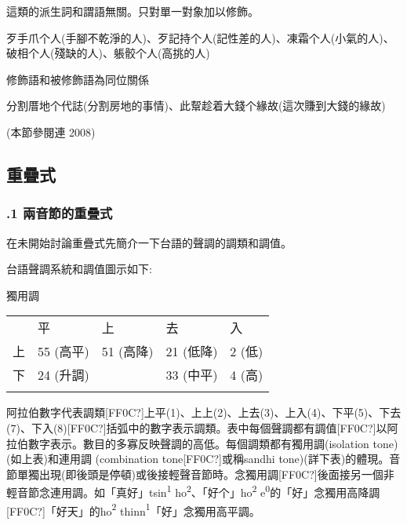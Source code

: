 \textrm{這類的派生詞和謂語無關。只對單一對象加以修飾。}

\textrm{歹手爪个人(手腳不乾淨的人)}、\textrm{歹記持个人(記性差的人)}、\textrm{凍霜个人(小氣的人)}、\textrm{破相个人(殘缺的人)}、\textrm{躼骹个人(高挑的人)}

\begin{listWWviiiNumxivleveli}
\item \begin{styleqwerty}\rmfamily
修飾語和被修飾語為同位關係
\end{styleqwerty}
\end{listWWviiiNumxivleveli}

\textrm{分割厝地个代誌(分割房地的事情)}、\textrm{此幚趁着大錢个緣故(這次賺到大錢的緣故)}

\rmfamily
(本節參閱連 2008)

\subsection{ 重疊式}
\subsubsection{.1 兩音節的重疊式}

\textrm{在未開始討論重疊式先簡介一下台語的聲調的調類和調值。}

\rmfamily
台語聲調系統和調值圖示如下:

獨用調

\tablefirsthead{}

\tabletail{}
\tablelasttail{}
\begin{tabularx}{\textwidth}{XXXXX} & 平 & 上 & 去 & 入\\
\lsptoprule
上 & 55 (高平) & 51 (高降) & 21 (低降) & 2 (低)\\
下 & 24 (升調) &  & 33 (中平) & 4 (高)\\
\lspbottomrule
\end{tabularx}
\textrm{阿拉伯數字代表調類[FF0C?]上平(1)}、\textrm{上上(2)}、\textrm{上去(3)}、\textrm{上入(4)}、\textrm{下平(5)}、\textrm{下去(7)}、\textrm{下入(8)}[FF0C?]\textrm{括弧中的數字表示調類。表中每個聲調都有調值[FF0C?]以阿拉伯數字表示。數目的多寡反映聲調的高低。每個調類都有獨用調(isolation tone)(如上表)和連用調 (combination tone[FF0C?]或稱sandhi tone)(詳下表)的體現。音節單獨出現(即後頭是停頓)或後接輕聲音節時。念獨用調[FF0C?]後面接另一個非輕音節念連用調。如「真好」tsin}\textrm{\textsuperscript{1}} \textrm{ho}\textrm{\textsuperscript{2}}、\textrm{「好个」ho}\textrm{\textsuperscript{2}} \textrm{e}\textrm{\textsuperscript{0}}\textrm{的「好」念獨用高降調[FF0C?]「好天」的ho}\textrm{\textsuperscript{2}} \textrm{thinn}\textrm{\textsuperscript{1}}\textrm{「好」念獨用高平調。}

